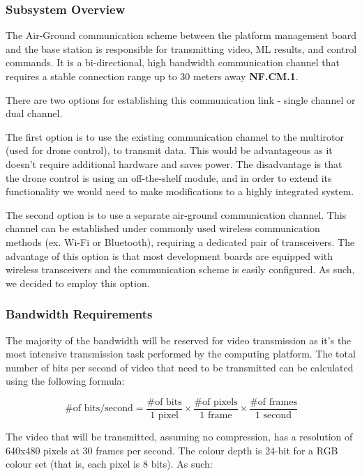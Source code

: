 \subsubsection{Subsystem Overview}
The Air-Ground communication scheme between the platform management board and the base station is responsible for transmitting video, ML results, and control commands. It is a bi-directional, high bandwidth communication channel that requires a stable connection range up to 30 meters away \textbf{NF.CM.1}.

There are two options for establishing this communication link - single channel or dual channel. 

The first option is to use the existing communication channel to the multirotor (used for drone control), to transmit data. This would be advantageous as it doesn't require additional hardware and saves power. The disadvantage is that the drone control is using an off-the-shelf module, and in order to extend its functionality we would need to make modifications to a highly integrated system. 

The second option is to use a separate air-ground communication channel. This channel can be established under commonly used wireless communication methods (ex. Wi-Fi or Bluetooth), requiring a dedicated pair of transceivers. The advantage of this option is that most development boards are equipped with wireless transceivers and the communication scheme is easily configured. As such, we decided to employ this option.

\subsubsection{Bandwidth Requirements}

The majority of the bandwidth will be reserved for video transmission as it's the most intensive transmission task performed by the computing platform. The total number of bits per second of video that need to be transmitted can be calculated using the following formula:

$$
\text{\# of bits/second} = \frac{\text{\# of bits}}{\text{1 pixel}} \times \frac{\text{\# of pixels}}{\text{1 frame}} \times \frac{\text{\# of frames}}{\text{1 second}}
$$

The video that will be transmitted, assuming no compression, has a resolution of 640x480 pixels at 30 frames per second. The colour depth is 24-bit for a RGB colour set (that is, each pixel is 8 bits). As such:


